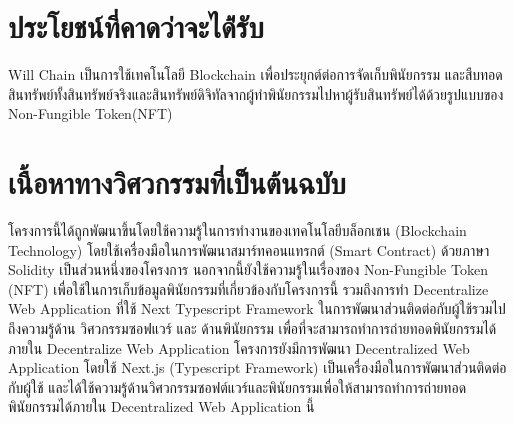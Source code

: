 \documentclass[12pt,oneside,openright,a4paper]{cpe-thai-project}
\begin{document}
\section{ประโยชน์ที่คาดว่าจะได้่รับ}
\tab Will Chain เป็นการใช้เทคโนโลยี Blockchain เพื่อประยุกต์ต่อการจัดเก็บพินัยกรรม และสืบทอดสินทรัพย์ทั้งสินทรัพย์จริงและสินทรัพย์ดิจิทัลจากผู้ทำพินัยกรรมไปหาผู้รับสินทรัพย์ได้ด้วยรูปแบบของ Non-Fungible Token(NFT)
\section{เนื้อหาทางวิศวกรรมที่เป็นต้นฉบับ}
\tab โครงการนี้ได้ถูกพัฒนาขึ้นโดยใช้ความรู้ในการทำงานของเทคโนโลยีบล็อกเชน (Blockchain Technology) โดยใช้เครื่องมือในการพัฒนาสมาร์ทคอนแทรกต์ (Smart Contract) ด้วยภาษา Solidity เป็นส่วนหนึ่งของโครงการ นอกจากนี้ยังใช้ความรู้ในเรื่องของ Non-Fungible Token (NFT) เพื่อใช้ในการเก็บข้อมูลพินัยกรรมที่เกี่ยวข้องกับโครงการนี้ รวมถึงการทำ Decentralize  Web Application ที่ใช้ Next Typescript Framework ในการพัฒนาส่วนติดต่อกับผู้ใช้รวมไปถึงความรู้ด้าน วิศวกรรมซอฟแวร์ และ ด้านพินัยกรรม เพื่อที่จะสามารถทำการถ่ายทอดพินัยกรรมได้ภายใน Decentralize  Web Application
\tab โครงการยังมีการพัฒนา Decentralized Web Application โดยใช้ Next.js (Typescript Framework) เป็นเครื่องมือในการพัฒนาส่วนติดต่อกับผู้ใช้ และได้ใช้ความรู้ด้านวิศวกรรมซอฟต์แวร์และพินัยกรรมเพื่อให้สามารถทำการถ่ายทอดพินัยกรรมได้ภายใน Decentralized Web Application นี้
\clearpage
\end{document}
